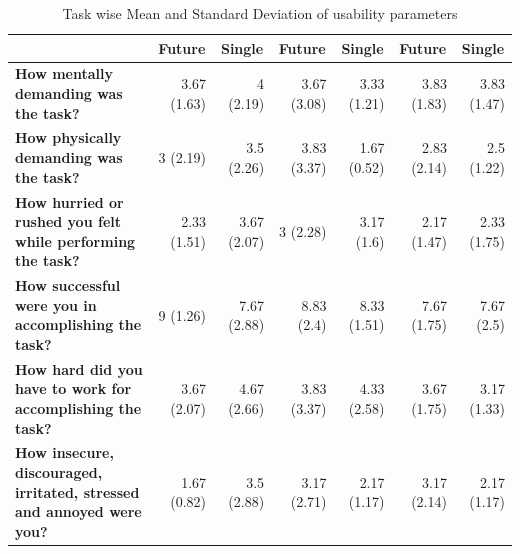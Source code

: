 \documentclass[english]{tktltiki}
\begin{document}
\begin{table}[h!]
\begin{center}
{\begin{tabular}{|p{6cm}|r|r|r|r|r|r|}
        \multicolumn{1}{|c|}{} & \multicolumn{1}{|c|}{\textbf{Future}} & \multicolumn{1}{|c|}{\textbf{Single}} & \multicolumn{1}{|c|}{\textbf{Future}} & \multicolumn{1}{|c|}{\textbf{Single}} & \multicolumn{1}{|c|}{\textbf{Future}} & \multicolumn{1}{|c|}{\textbf{Single}} \\
        \hline
        
        \textbf{How mentally demanding was the task?} & 3.67 (1.63) & 4 (2.19) & 3.67 (3.08) & 3.33 (1.21) & 3.83 (1.83) & 3.83  (1.47)\\
        \hline
        
        \textbf{How physically demanding was the task?} & 3 (2.19) & 3.5 (2.26) & 3.83 (3.37) & 1.67 (0.52) & 2.83 (2.14) & 2.5 (1.22) \\
        \hline
        
        \textbf{How hurried or rushed you felt while performing the task?} & 2.33 (1.51) & 3.67 (2.07) & 3 (2.28) & 3.17 (1.6) & 2.17 (1.47) & 2.33 (1.75) \\
        \hline
        
        \textbf{How successful were you in accomplishing the task?} & 9 (1.26) & 7.67 (2.88) & 8.83 (2.4) & 8.33 (1.51) & 7.67 (1.75) & 7.67 (2.5) \\
        \hline
        
        \textbf{How hard did you have to work for accomplishing the task?} & 3.67 (2.07) & 4.67 (2.66) & 3.83 (3.37) & 4.33 (2.58) & 3.67 (1.75) & 3.17 (1.33) \\
        \hline
        
        \textbf{How insecure, discouraged, irritated, stressed and annoyed were you?} & 1.67 (0.82) & 3.5 (2.88) & 3.17 (2.71) & 2.17 (1.17) & 3.17 (2.14) & 2.17 (1.17) \\
        \hline
        
    \end{tabular}
    }
	\end{center}
	\caption{Task wise Mean and Standard Deviation of usability parameters}
    \label{table:use_mean_std_task}
\end{table}



\iffalse
\end{document}
